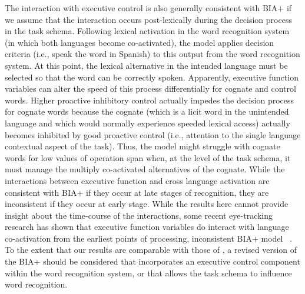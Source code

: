 The interaction with executive control is also generally consistent with BIA+ if we assume that the interaction occurs post-lexically during the decision process in the task schema. Following lexical activation in the word recognition system (in which both languages become co-activated), the model applies decision criteria (i.e., speak the word in Spanish) to this output from the word recognition system. At this point, the lexical alternative in the intended language must be selected so that the word can be correctly spoken. Apparently, executive function variables can alter the speed of this process differentially for cognate and control words. Higher proactive inhibitory control actually impedes the decision process for cognate words because the cognate (which is a licit word in the unintended language and which would normally experience speeded lexical access) actually becomes inhibited by good proactive control (i.e., attention to the single language contextual aspect of the task). Thus, the model might struggle with cognate words for low values of operation span when, at the level of the task schema, it must manage the multiply co-activated alternatives of the cognate. While the interactions between executive function and cross language activation are consistent with BIA+ if they occur at late stages of recognition, they are inconsistent if they occur at early stage. While the results here cannot provide insight about the time-course of the interactions, some recent eye-tracking research has shown that executive function variables do interact with language co-activation from the earliest points of processing, inconsistent BIA+ model ~\citep{Pivneva2014}. To the extent that our results are comparable with those of  \citet{Pivneva2014}, a revised version of the BIA+ should be considered that incorporates an executive control component within the word recognition system, or that allows the task schema to influence word recognition.

